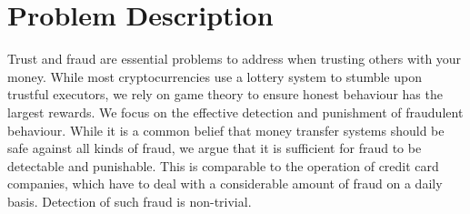 


\section{Problem Description}
Trust and fraud are essential problems to address when trusting others with your money. %
While most cryptocurrencies use a lottery system to stumble upon trustful executors, we rely on game theory to ensure honest behaviour has the largest rewards.
We focus on the effective detection and punishment of fraudulent behaviour.
While it is a common belief that money transfer systems should be safe against all kinds of fraud, we argue that it is sufficient for fraud to be detectable and punishable.
This is comparable to the operation of credit card companies, which have to deal with a considerable amount of fraud on a daily basis.
Detection of such fraud is non-trivial.

